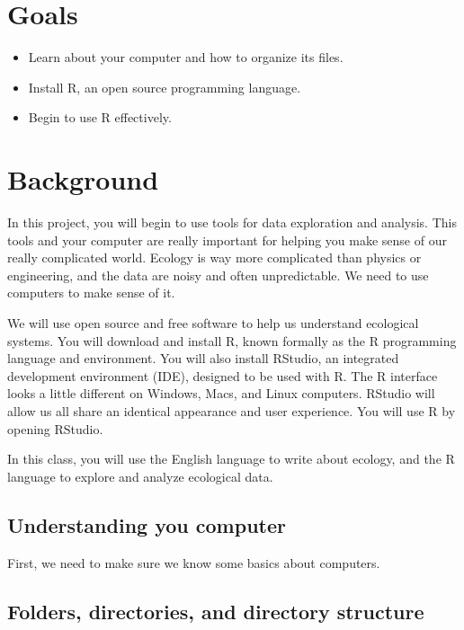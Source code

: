 \documentclass[
  letterpaper,
  DIV=11,
  numbers=noendperiod]{scrreprt}
\providecommand{\tightlist}{%
  \setlength{\itemsep}{0pt}\setlength{\parskip}{0pt}}
\begin{document}
\section{Goals}\label{goals}

\begin{itemize}
\tightlist
\item
  Learn about your computer and how to organize its files.
\item
  Install R, an open source programming language.
\item
  Begin to use R effectively.
\end{itemize}

\section{Background}\label{background-1}

In this project, you will begin to use tools for data exploration and
analysis. This tools and your computer are really important for helping
you make sense of our really complicated world. Ecology is way more
complicated than physics or engineering, and the data are noisy and
often unpredictable. We need to use computers to make sense of it.

We will use open source and free software to help us understand
ecological systems. You will download and install R, known formally as
the R programming language and environment. You will also install
RStudio, an integrated development environment (IDE), designed to be
used with R. The R interface looks a little different on Windows, Macs,
and Linux computers. RStudio will allow us all share an identical
appearance and user experience. You will use R by opening RStudio.

In this class, you will use the English language to write about ecology,
and the R language to explore and analyze ecological data.

\subsection{Understanding you
computer}\label{understanding-you-computer}

First, we need to make sure we know some basics about computers.

\subsection{Folders, directories, and directory
structure}\label{folders-directories-and-directory-structure}
\end{document}
